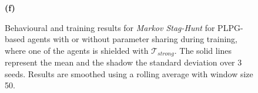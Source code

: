 \begin{figure}[h!]
\begin{minipage}[b]{0.32\textwidth}
        \textbf{(f)}
        \label{fig:msh_part_results:subfig6}
    \end{minipage}

    \caption[Results for Partially Shielded \textit{Markov Stag-Hunt}.]{Behavioural and training results for \textit{Markov Stag-Hunt} for PLPG-based agents with or without parameter sharing during training, where one of the agents is shielded with $\mathcal{T}_{strong}$. The solid lines represent the mean and the shadow the standard deviation over 3 seeds. Results are smoothed using a rolling average with window size 50.}
    \label{fig:msh_part_results}
\end{figure}
